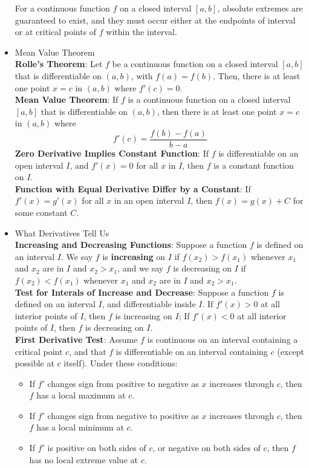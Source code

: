 \documentclass{article}
\begin{document}
\begin{itemize}
    For a continuous function $f$ on a closed interval $[a, b]$, absolute extremes are guaranteed to exist, and they must occur either at the endpoints of interval or at critical points of $f$ within the interval.
    \item Mean Value Theorem \\
    \textbf{Rolle's Theorem}: Let $f$ be a continuous function on a closed interval $[a, b]$ that is differentiable on $(a, b)$, with $f(a) = f(b)$. Then, there is at least one point $x = c$ in $(a, b)$ where $f'(c) = 0$. \\
    \textbf{Mean Value Theorem}: If $f$ is a continuous function on a closed interval $[a, b]$ that is differentiable on $(a, b)$, then there is at least one point $x = c$ in $(a, b)$ where
    $$f'(c) = \frac{f(b) - f(a)}{b - a}$$
    \textbf{Zero Derivative Implies Constant Function}: If $f$ is differentiable on an open interval $I$, and $f'(x) = 0$ for all $x$ in $I$, then $f$ is a constant function on $I$. \\
    \textbf{Function with Equal Derivative Differ by a Constant}: If $f'(x) = g'(x)$ for all $x$ in an open interval $I$, then $f(x) = g(x) + C$ for some constant $C$.
    \item What Derivatives Tell Us \\
    \textbf{Increasing and Decreasing Functions}: Suppose a function $f$ is defined on an interval $I$. We say $f$ is \textbf{increasing} on $I$ if $f(x_2) > f(x_1)$ whenever $x_1$ and $x_2$ are in $I$ and $x_2 > x_1$, and we say $f$ is decreasing on $I$ if $f(x_2) < f(x_1)$ whenever $x_1$ and $x_2$ are in $I$ and $x_2 > x_1$. \\
    \textbf{Test for Interals of Increase and Decrease}: Suppose a function $f$ is defined on an interval $I$, and differentiable inside $I$. If $f'(x) > 0$ at all interior points of $I$, then $f$ is increasing on $I$; If $f'(x) < 0$ at all interior points of $I$, then $f$ is decreasing on $I$. \\
    \textbf{First Derivative Test}: Assume $f$ is continuous on an interval containing a critical point $c$, and that $f$ is differentiable on an interval containing $c$ (except possible at $c$ itself). Under these conditions:
    \begin{itemize}
        \item If $f'$ changes sign from positive to negative as $x$ increases through $c$, then $f$ has a local maximum at $c$.
        \item If $f'$ changes sign from negative to positive as $x$ increases through $c$, then $f$ has a local minimum at $c$.
        \item If $f'$ is positive on both sides of $c$, or negative on both sides of $c$, then $f$ has no local extreme value at $c$.
    \end{itemize}
\end{itemize}
\end{document}
